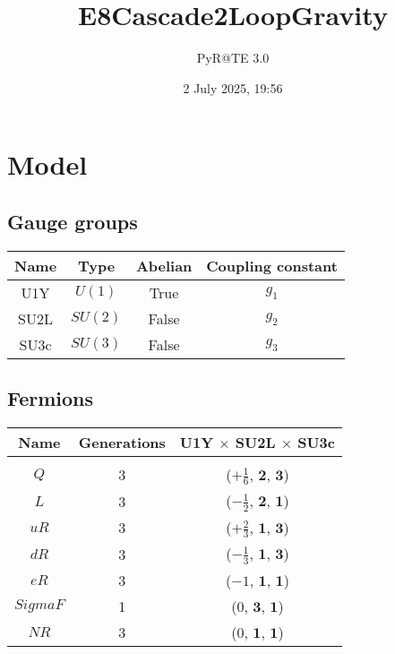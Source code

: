\documentclass[12pt]{article}
\title{E8Cascade2LoopGravity}
\author{PyR@TE 3.0}
\date{2 July 2025, 19:56}
\begin{document}
    \maketitle
    \tableofcontents
    \clearpage

\section{Model}

\subsection{Gauge groups}

\begin{table}[h]
\renewcommand{\arraystretch}{1.3}
\centering
\begin{tabular}{c@{\hskip .66cm}c@{\hskip .66cm}c@{\hskip .5cm}c}
\hline
Name & Type & Abelian & Coupling constant \\ \hline
U1Y & $U(1)$ & True & $g_{1}$ \\
SU2L & $SU(2)$ & False & $g_{2}$ \\
SU3c & $SU(3)$ & False & $g_{3}$ \\ \hline
\end{tabular}
\end{table}

\subsection{Fermions}

\begin{table}[h]
\renewcommand{\arraystretch}{1.15}
\centering
\begin{tabular}{c@{\hskip .66cm}c@{\hskip .66cm}c}
\hline
Name & Generations & U1Y $\times$ SU2L $\times$ SU3c\\ \hline \\ [-2ex]
$Q$ & 3 & ($+\frac{1}{6}$, $\mathbf{2}$, $\mathbf{3}$) \\[.2cm]
$L$ & 3 & ($- \frac{1}{2}$, $\mathbf{2}$, $\mathbf{1}$) \\[.2cm]
$uR$ & 3 & ($+\frac{2}{3}$, $\mathbf{1}$, $\mathbf{3}$) \\[.2cm]
$dR$ & 3 & ($- \frac{1}{3}$, $\mathbf{1}$, $\mathbf{3}$) \\[.2cm]
$eR$ & 3 & ($-1$, $\mathbf{1}$, $\mathbf{1}$) \\[.2cm]
$SigmaF$ & 1 & ($0$, $\mathbf{3}$, $\mathbf{1}$) \\[.2cm]
$NR$ & 3 & ($0$, $\mathbf{1}$, $\mathbf{1}$) \\[.1cm] \hline
\end{tabular}
\end{table}
\end{document}
